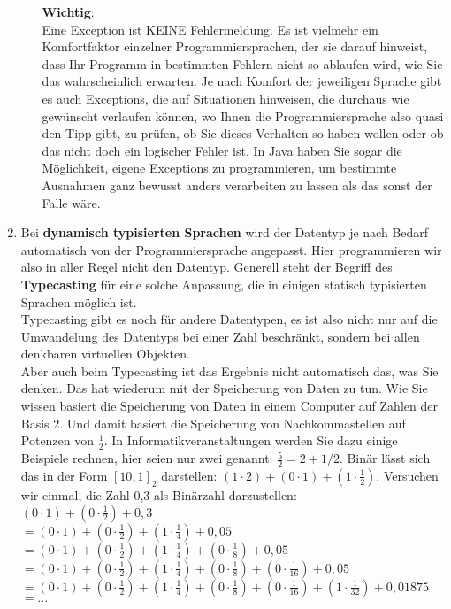 \begin{enumerate}
\begin{enumerate}
		\textbf{Wichtig}:\\
		Eine Exception ist KEINE Fehlermeldung. Es ist vielmehr ein Komfortfaktor einzelner Programmiersprachen, der sie darauf hinweist, dass Ihr Programm in bestimmten Fehlern nicht so ablaufen wird, wie Sie das wahrscheinlich erwarten. Je nach Komfort der jeweiligen Sprache gibt es auch Exceptions, die auf Situationen hinweisen, die durchaus wie gewünscht verlaufen können, wo Ihnen die Programmiersprache also quasi den Tipp gibt, zu prüfen, ob Sie dieses Verhalten so haben wollen oder ob das nicht doch ein logischer Fehler ist. In Java haben Sie sogar die Möglichkeit, eigene Exceptions zu programmieren, um bestimmte Ausnahmen ganz bewusst anders verarbeiten zu lassen als das sonst der Falle wäre.
	\end{enumerate}
	
	\item Bei \textbf{dynamisch typisierten Sprachen} wird der Datentyp je nach Bedarf automatisch von der Programmiersprache angepasst. Hier programmieren wir also in aller Regel nicht den Datentyp. Generell steht der Begriff des \textbf{Typecasting} für eine solche Anpassung, die in einigen statisch typisierten Sprachen möglich ist.\\
	
	Typecasting gibt es noch für andere Datentypen, es ist also nicht nur auf die Umwandelung des Datentyps bei einer Zahl beschränkt, sondern bei allen denkbaren virtuellen Objekten.\\
	
	Aber auch beim Typecasting ist das Ergebnis nicht automatisch das, was Sie denken. Das hat wiederum mit der Speicherung von Daten zu tun. Wie Sie wissen basiert die Speicherung von Daten in einem Computer auf Zahlen der Basis 2. Und damit basiert die Speicherung von Nachkommastellen auf Potenzen von \(\frac{1}{2}\). In Informatikveranstaltungen werden Sie dazu einige Beispiele rechnen, hier seien nur zwei genannt: \(\frac{5}{2} = 2 + 1/2\). Binär lässt sich das in der Form \([10,1]_2\) darstellen: \((1 \cdot 2) + (0 \cdot 1) + (1 \cdot \frac{1}{2})\). Versuchen wir einmal, die Zahl 0,3 als Binärzahl darzustellen: \\
	
	\((0 \cdot 1) + (0 \cdot \frac{1}{2}) + 0,3\) \\
	\(= (0 \cdot 1) + (0 \cdot \frac{1}{2}) + (1 \cdot \frac{1}{4}) + 0,05 \)\\
	\(= (0 \cdot 1) + (0 \cdot \frac{1}{2}) + (1 \cdot \frac{1}{4}) + (0 \cdot \frac{1}{8}) + 0,05 \)\\
	\(= (0 \cdot 1) + (0 \cdot \frac{1}{2}) + (1 \cdot \frac{1}{4}) + (0 \cdot \frac{1}{8}) + (0 \cdot \frac{1}{16}) + 0,05 \)\\
	\(= (0 \cdot 1) + (0 \cdot \frac{1}{2}) + (1 \cdot \frac{1}{4}) + (0 \cdot \frac{1}{8}) + (0 \cdot \frac{1}{16}) + (1 \cdot \frac{1}{32}) + 0,01875 \)\\
	\(= ...\)\\
	

\end{enumerate}
